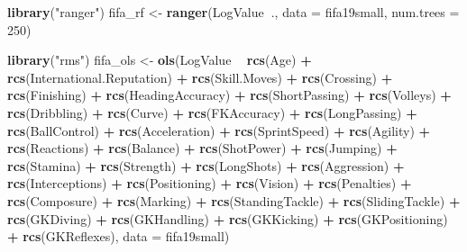 \documentclass[12pt,]{krantz}
\newenvironment{Shaded}{\begin{snugshade}}{\end{snugshade}}
\newcommand{\DataTypeTok}[1]{\textcolor[rgb]{0.13,0.29,0.53}{#1}}
\newcommand{\DecValTok}[1]{\textcolor[rgb]{0.00,0.00,0.81}{#1}}
\newcommand{\KeywordTok}[1]{\textcolor[rgb]{0.13,0.29,0.53}{\textbf{#1}}}
\newcommand{\NormalTok}[1]{#1}
\newcommand{\OperatorTok}[1]{\textcolor[rgb]{0.81,0.36,0.00}{\textbf{#1}}}
\newcommand{\StringTok}[1]{\textcolor[rgb]{0.31,0.60,0.02}{#1}}
\begin{document}
\begin{Shaded}
\begin{Highlighting}[]
\KeywordTok{library}\NormalTok{(}\StringTok{"ranger"}\NormalTok{)}
\NormalTok{fifa_rf <-}\StringTok{ }\KeywordTok{ranger}\NormalTok{(LogValue}\OperatorTok{~}\NormalTok{., }\DataTypeTok{data =}\NormalTok{ fifa19small, }\DataTypeTok{num.trees =} \DecValTok{250}\NormalTok{)}

\KeywordTok{library}\NormalTok{(}\StringTok{"rms"}\NormalTok{)}
\NormalTok{fifa_ols <-}\StringTok{ }\KeywordTok{ols}\NormalTok{(LogValue }\OperatorTok{~}\StringTok{ }\KeywordTok{rcs}\NormalTok{(Age) }\OperatorTok{+}\StringTok{ }\KeywordTok{rcs}\NormalTok{(International.Reputation) }\OperatorTok{+}\StringTok{ }\KeywordTok{rcs}\NormalTok{(Skill.Moves) }\OperatorTok{+}\StringTok{ }\KeywordTok{rcs}\NormalTok{(Crossing) }\OperatorTok{+}\StringTok{ }\KeywordTok{rcs}\NormalTok{(Finishing) }\OperatorTok{+}\StringTok{ }\KeywordTok{rcs}\NormalTok{(HeadingAccuracy) }\OperatorTok{+}\StringTok{ }\KeywordTok{rcs}\NormalTok{(ShortPassing) }\OperatorTok{+}\StringTok{ }\KeywordTok{rcs}\NormalTok{(Volleys) }\OperatorTok{+}\StringTok{ }\KeywordTok{rcs}\NormalTok{(Dribbling) }\OperatorTok{+}\StringTok{ }\KeywordTok{rcs}\NormalTok{(Curve) }\OperatorTok{+}\StringTok{ }\KeywordTok{rcs}\NormalTok{(FKAccuracy) }\OperatorTok{+}\StringTok{ }\KeywordTok{rcs}\NormalTok{(LongPassing) }\OperatorTok{+}\StringTok{ }\KeywordTok{rcs}\NormalTok{(BallControl) }\OperatorTok{+}\StringTok{ }\KeywordTok{rcs}\NormalTok{(Acceleration) }\OperatorTok{+}\StringTok{ }\KeywordTok{rcs}\NormalTok{(SprintSpeed) }\OperatorTok{+}\StringTok{ }\KeywordTok{rcs}\NormalTok{(Agility) }\OperatorTok{+}\StringTok{ }\KeywordTok{rcs}\NormalTok{(Reactions) }\OperatorTok{+}\StringTok{ }\KeywordTok{rcs}\NormalTok{(Balance) }\OperatorTok{+}\StringTok{ }\KeywordTok{rcs}\NormalTok{(ShotPower) }\OperatorTok{+}\StringTok{ }\KeywordTok{rcs}\NormalTok{(Jumping) }\OperatorTok{+}\StringTok{ }\KeywordTok{rcs}\NormalTok{(Stamina) }\OperatorTok{+}\StringTok{ }\KeywordTok{rcs}\NormalTok{(Strength) }\OperatorTok{+}\StringTok{ }\KeywordTok{rcs}\NormalTok{(LongShots) }\OperatorTok{+}\StringTok{ }\KeywordTok{rcs}\NormalTok{(Aggression) }\OperatorTok{+}\StringTok{ }\KeywordTok{rcs}\NormalTok{(Interceptions) }\OperatorTok{+}\StringTok{ }\KeywordTok{rcs}\NormalTok{(Positioning) }\OperatorTok{+}\StringTok{ }\KeywordTok{rcs}\NormalTok{(Vision) }\OperatorTok{+}\StringTok{ }\KeywordTok{rcs}\NormalTok{(Penalties) }\OperatorTok{+}\StringTok{ }\KeywordTok{rcs}\NormalTok{(Composure) }\OperatorTok{+}\StringTok{ }\KeywordTok{rcs}\NormalTok{(Marking) }\OperatorTok{+}\StringTok{ }\KeywordTok{rcs}\NormalTok{(StandingTackle) }\OperatorTok{+}\StringTok{ }\KeywordTok{rcs}\NormalTok{(SlidingTackle) }\OperatorTok{+}\StringTok{ }\KeywordTok{rcs}\NormalTok{(GKDiving) }\OperatorTok{+}\StringTok{ }\KeywordTok{rcs}\NormalTok{(GKHandling) }\OperatorTok{+}\StringTok{ }\KeywordTok{rcs}\NormalTok{(GKKicking) }\OperatorTok{+}\StringTok{ }\KeywordTok{rcs}\NormalTok{(GKPositioning) }\OperatorTok{+}\StringTok{ }\KeywordTok{rcs}\NormalTok{(GKReflexes), }\DataTypeTok{data =}\NormalTok{ fifa19small)}
\end{Highlighting}
\end{Shaded}
\end{document}

